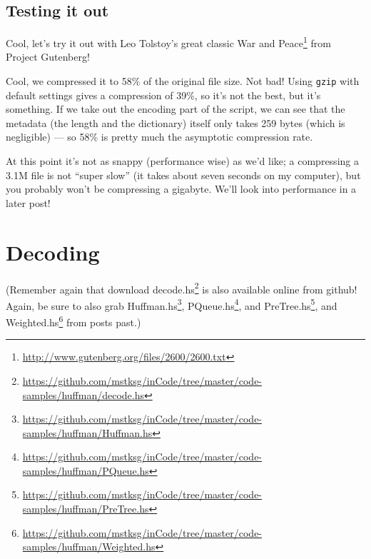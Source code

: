 \documentclass[]{article}
\newenvironment{Shaded}{\begin{snugshade}}{\end{snugshade}}
\newcommand{\CommentTok}[1]{\textcolor[rgb]{0.56,0.35,0.01}{\textit{#1}}}
\newcommand{\ExtensionTok}[1]{#1}
\newcommand{\FunctionTok}[1]{\textcolor[rgb]{0.00,0.00,0.00}{#1}}
\newcommand{\NormalTok}[1]{#1}
\renewcommand{\href}[2]{#2\footnote{\url{#1}}}
\begin{document}
\hypertarget{testing-it-out}{%
\subsection{Testing it out}\label{testing-it-out}}

Cool, let's try it out with Leo Tolstoy's great classic
\href{http://www.gutenberg.org/files/2600/2600.txt}{War and Peace} from Project
Gutenberg!

\begin{Shaded}
\end{Shaded}

Cool, we compressed it to 58\% of the original file size. Not bad! Using
\texttt{gzip} with default settings gives a compression of 39\%, so it's not the
best, but it's something. If we take out the encoding part of the script, we can
see that the metadata (the length and the dictionary) itself only takes 259
bytes (which is negligible) --- so 58\% is pretty much the asymptotic
compression rate.

At this point it's not as snappy (performance wise) as we'd like; a compressing
a 3.1M file is not ``super slow'' (it takes about seven seconds on my computer),
but you probably won't be compressing a gigabyte. We'll look into performance in
a later post!

\hypertarget{decoding}{%
\section{Decoding}\label{decoding}}

(Remember again that download
\href{https://github.com/mstksg/inCode/tree/master/code-samples/huffman/decode.hs}{decode.hs}
is also available online from github! Again, be sure to also grab
\href{https://github.com/mstksg/inCode/tree/master/code-samples/huffman/Huffman.hs}{Huffman.hs},
\href{https://github.com/mstksg/inCode/tree/master/code-samples/huffman/PQueue.hs}{PQueue.hs},
and
\href{https://github.com/mstksg/inCode/tree/master/code-samples/huffman/PreTree.hs}{PreTree.hs},
and
\href{https://github.com/mstksg/inCode/tree/master/code-samples/huffman/Weighted.hs}{Weighted.hs}
from posts past.)
\end{document}
